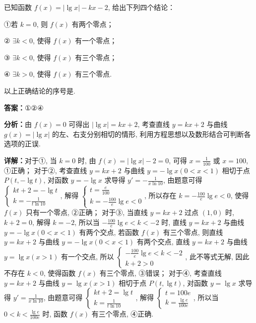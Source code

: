 \begin{question}[points=5]
已知函数 $f(x)=|\lg x|-kx-2$, 给出下列四个结论：

①若 $k=0$, 则 $f(x)$ 有两个零点；

② $\exists k<0$, 使得 $f(x)$ 有一个零点；

③ $\exists k<0$, 使得 $f(x)$ 有三个零点；

④ $\exists k>0$, 使得 $f(x)$ 有三个零点.

以上正确结论的序号是.
\fillin[{$①②④$}]
\begin{solution}
\textbf{答案：}$①②④$

\textbf{分析：}由 $f(x)=0$ 可得出 $|\lg x|=kx+2$, 考查直线 $y=kx+2$ 与曲线 $g(x)=|\lg x|$ 的左、右支分别相切的情形, 利用方程思想以及数形结合可判断各选项的正误.

\textbf{详解：}对于①, 当 $k=0$ 时, 由 $f(x)=|\lg x|-2=0$, 可得 $x=\frac{1}{100}$ 或 $x=100$, ①正确；
对于②, 考查直线 $y=kx+2$ 与曲线 $y=-\lg x(0<x<1)$ 相切于点 $P(t,-\lg t)$, 对函数 $y=-\lg x$ 求导得 $y'=-\frac{1}{x\ln 10}$, 由题意可得 $\begin{cases} kt+2=-\lg t \\ k=-\frac{1}{t\ln 10} \end{cases}$, 解得 $\begin{cases} t=\frac{e}{100} \\ k=-\frac{100}{e}\lg e<0 \end{cases}$, 所以存在 $k=-\frac{100}{e}\lg e<0$, 使得 $f(x)$ 只有一个零点, ②正确；
对于③, 当直线 $y=kx+2$ 过点 $(1,0)$ 时, $k+2=0$, 解得 $k=-2$, 所以当 $-\frac{100}{e}\lg e<k<-2$ 时, 直线 $y=kx+2$ 与曲线 $y=-\lg x(0<x<1)$ 有两个交点, 若函数 $f(x)$ 有三个零点, 则直线 $y=kx+2$ 与曲线 $y=-\lg x(0<x<1)$ 有两个交点, 直线 $y=kx+2$ 与曲线 $y=\lg x(x>1)$ 有一个交点, 所以 $\begin{cases} -\frac{100}{e}\lg e<k<-2 \\ k+2>0 \end{cases}$, 此不等式无解, 因此不存在 $k<0$, 使得函数 $f(x)$ 有三个零点, ③错误；
对于④, 考查直线 $y=kx+2$ 与曲线 $y=\lg x(x>1)$ 相切于点 $P(t,\lg t)$, 对函数 $y=\lg x$ 求导得 $y'=\frac{1}{x\ln 10}$, 由题意可得 $\begin{cases} kt+2=\lg t \\ k=\frac{1}{t\ln 10} \end{cases}$, 解得 $\begin{cases} t=100e \\ k=\frac{\lg e}{100e} \end{cases}$, 所以当 $0<k<\frac{\lg e}{100e}$ 时, 函数 $f(x)$ 有三个零点, ④正确.
\end{solution}
\end{question}

